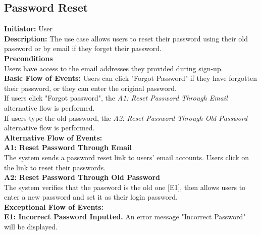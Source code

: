 \documentclass[a4paper,11pt]{scrreprt}
\begin{document}
\begin{figure}[H]
    \centering
    
\end{figure}

\subsection{Password Reset}
\textbf{\large Initiator: }User\\
\textbf{\large Description: }The use case allows users to reset their password using their old password or by email if they forget their password.\\
\textbf{\large Preconditions }\\
Users have access to the email addresses they provided during sign-up.\\
\textbf{\large Basic Flow of Events: }Users can click "Forgot Password" if they have forgotten their password, or they can enter the original password.\\
If users click "Forgot password", the \textit{A1: Reset Password Through Email} alternative flow is performed.\\
If users type the old password, the \textit{A2: Reset Password Through Old Password} alternative flow is performed.\\
\textbf{\large Alternative Flow of Events: }\\
\textbf{A1: Reset Password Through Email}\\
The system sends a password reset link to users' email accounts. Users click on the link to reset their passwords.\\
\textbf{A2: Reset Password Through Old Password}\\
The system verifies that the password is the old one [E1], then allows users to enter a new password and set it as their login password.\\
\textbf{\large Exceptional Flow of Events:}\\
\textbf{E1: Incorrect Password Inputted.} An error message "Incorrect Password" will be displayed.

\begin{figure}[H]
    \centering
    
\end{figure}
\end{document}

